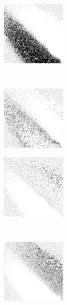 
\begin{figure}
\center

	\begin{subfigure}[b]{0.4\textwidth}
		\includegraphics[height=0.23\textheight]{images/findings/round2/strats/random/hand_max_min.png}
		\caption{\handmaxmin}
	\end{subfigure}
	~
	\begin{subfigure}[b]{0.4\textwidth}
		\includegraphics[height=0.23\textheight]{images/findings/round2/strats/random/hand_max_avg.png}
		\caption{\handmaxavg}
	\end{subfigure}

	\begin{subfigure}[b]{0.4\textwidth}
		\includegraphics[height=0.23\textheight]{images/findings/round2/strats/random/hand_max_med.png}
		\caption{\handmaxmed}
	\end{subfigure}
	~
	\begin{subfigure}[b]{0.4\textwidth}
		\includegraphics[height=0.23\textheight]{images/findings/round2/strats/random/hand_max_poss.png}
		\caption{\handmaxposs}
	\end{subfigure}


\end{figure}
